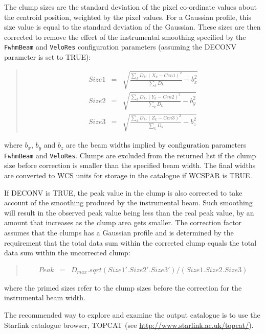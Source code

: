 \documentclass[twoside,11pt]{starlink}
\newenvironment{myquote}{\begin{quote}\begin{small}}{\end{small}\end{quote}}
\begin{document}
The clump sizes are the standard deviation of the pixel co-ordinate
values about the centroid position, weighted by the pixel values. For a
Gaussian profile, this size value is equal to the standard deviation of the
Gaussian. These sizes are then corrected to remove the effect of the
instrumental smoothing specified by the \texttt{FwhmBeam} and \texttt{VeloRes}
configuration parameters (assuming the DECONV parameter is set to TRUE):

\begin{myquote}
\begin{eqnarray*}
  Size1 & = & \sqrt{\frac{\sum_{k}D_{k}.(X_{k}-Cen1)^{2}}{\sum_{k}D_{k}} - b_{x}^{2} } \\
  Size2 & = & \sqrt{\frac{\sum_{k}D_{k}.(Y_{k}-Cen2)^{2}}{\sum_{k}D_{k}} - b_{y}^{2} } \\
  Size3 & = & \sqrt{\frac{\sum_{k}D_{k}.(Z_{k}-Cen3)^{2}}{\sum_{k}D_{k}} - b_{z}^{2} }
\end{eqnarray*}
\end{myquote}

where $b_{x}$, $b_{y}$ and $b_{z}$ are the beam widths implied by
configuration parameters \texttt{FwhmBeam} and \texttt{VeloRes}. Clumps are excluded
from the returned list if the clump size before correction is smaller than the
specified beam width. The final widths are converted to WCS units for
storage in the catalogue if WCSPAR is TRUE.

If DECONV is TRUE, the peak value in the clump is also corrected to take
account of the smoothing produced by the instrumental beam. Such
smoothing will result in the observed peak value being less than the real
peak value, by an amount that increases as the clump area gets smaller.
The correction factor assumes that the clumps has a Gaussian profile and
is determined by the requirement that the total data sum within the
corrected clump equals the total data sum within the uncorrected clump:

\begin{myquote}
\begin{eqnarray*}
  Peak & = & D_{max}.sqrt{ (Size1'.Size2'.Size3')/(Size1.Size2.Size3)  }
\end{eqnarray*}
\end{myquote}

where the primed sizes refer to the clump sizes before the correction for
the instrumental beam width.

The recommended way to explore and examine the output catalogue is to use
the Starlink catalogue browser, TOPCAT (see
\url{http://www.starlink.ac.uk/topcat/}).
\end{document}
